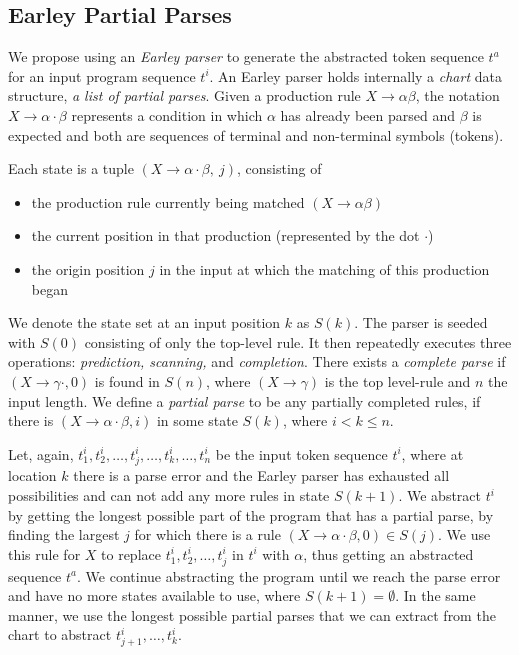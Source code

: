 \subsection{Earley Partial Parses}
\label{sec:prog-abstract:partial}

We propose using an \emph{Earley parser} to generate the abstracted token
sequence $t^a$ for an input program sequence $t^i$. An Earley parser holds
internally a \emph{chart} data structure, \ie \emph{a list of partial parses}.
Given a production rule $X \rightarrow \alpha \beta$, the notation $X
\rightarrow \alpha \cdot \beta$ represents a condition in which $\alpha$ has
already been parsed and $\beta$ is expected and both are sequences of terminal
and non-terminal symbols (tokens).

Each state is a tuple $(X \rightarrow \alpha \cdot \beta,\ j)$, consisting of
\begin{itemize}
    \item the production rule currently being matched $(X \rightarrow \alpha
    \beta)$
    \item the current position in that production (represented by the dot
    $\cdot$)
    \item the origin position $j$ in the input at which the matching of this
    production began
\end{itemize}

We denote the state set at an input position $k$ as $S(k)$. The parser is seeded
with $S(0)$ consisting of only the top-level rule. It then repeatedly executes
three operations: \emph{prediction, scanning,} and \emph{completion}. There
exists a \emph{complete parse} if $(X \rightarrow \gamma \cdot, 0)$ is found in
$S(n)$, where $(X \rightarrow \gamma)$ is the top level-rule and $n$ the input
length. We define a \emph{partial parse} to be any partially completed rules,
\ie if there is $(X \rightarrow \alpha \cdot \beta, i)$ in some state $S(k)$,
where $i < k \leq n$.

Let, again, $t^i_1, t^i_2, \dots, t^i_j, \dots, t^i_k, \dots, t^i_n$ be the
input token sequence $t^i$, where at location $k$ there is a parse error and the
Earley parser has exhausted all possibilities and can not add any more rules in
state $S(k + 1)$. We abstract $t^i$ by getting the longest possible part of the
program that has a partial parse, \ie by finding the largest $j$ for which there
is a rule $(X \rightarrow \alpha \cdot \beta, 0) \in S(j)$. We use this rule for
$X$ to replace $t^i_1, t^i_2, \dots, t^i_j$ in $t^i$ with $\alpha$, thus getting
an abstracted sequence $t^a$. We continue abstracting the program until we reach
the parse error and have no more states available to use, \ie where $S(k + 1) =
\emptyset$. In the same manner, we use the longest possible partial parses that
we can extract from the chart to abstract $t^i_{j+1}, \dots, t^i_k$.

